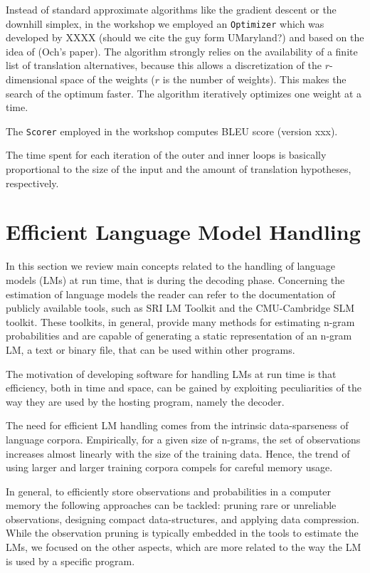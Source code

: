 \documentclass[10pt]{report}
\theoremstyle{plain}
\begin{document}
{Instead of standard approximate algorithms like the gradient descent or the downhill simplex, in the workshop we employed an {\tt Optimizer} which was developed by XXXX (should we cite the guy form UMaryland?) and based on the idea of \cite{xx} (Och's paper). The algorithm strongly relies on the availability of a finite list of translation alternatives, because this allows a discretization of the $r$-dimensional space of the weights ($r$ is the number of weights). This makes the search of the optimum  faster. The algorithm iteratively optimizes one weight at a time.

The {\tt Scorer} employed in the workshop computes BLEU score (version xxx).

The time spent for each iteration of the outer and inner loops is basically proportional to the size of the input and the amount of translation hypotheses, respectively.

\section{Efficient Language Model Handling}

In this section we review main concepts related to the handling of language models (LMs) 
at run time, that is during the decoding phase. Concerning the estimation of language 
models the reader can refer to the documentation of publicly available tools, such as 
SRI LM Toolkit and the CMU-Cambridge SLM toolkit.  These toolkits, in general, provide many 
methods for estimating n-gram probabilities and are capable of generating  a static 
representation of an n-gram LM, a text or binary file, that can  be used within other programs.   

The motivation of developing software for handling LMs at run time is that efficiency, both 
in time and space, can be gained by exploiting peculiarities  of the way they are used by the 
hosting program, namely the decoder.  

The need for efficient LM handling comes from the  intrinsic data-sparseness of language corpora. 
Empirically, for a given size of n-grams,   the set of
observations increases  almost linearly with the size  of the training
data.  Hence, the trend of using larger and larger training corpora compels for careful memory
usage.

In general, to efficiently  store observations and probabilities in a
computer  memory the  following approaches  can be  tackled:  pruning  rare or unreliable observations, designing compact data-structures,  and applying data compression. While the observation pruning is typically embedded in the tools to estimate the LMs, we focused
on the other aspects, which are more related to the way the LM is used by a specific program.

}
\end{document}
